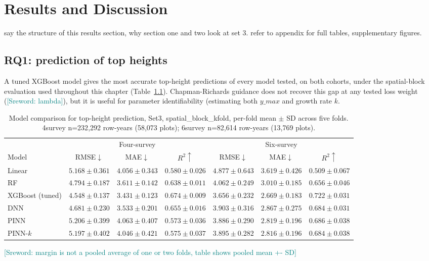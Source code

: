 \documentclass[logo,msc,ai]{infthesis}           %
\newcommand{\sr}[1]{\textcolor{teal}{[Sreword: #1]}}
\begin{document}
\chapter{Results and Discussion}
\label{ch:results}

say the structure of this results section, why section one and two look at set 3. refer to appendix for full tables, supplementary figures. 

\section{RQ1: prediction of top heights} 

A tuned XGBoost model gives the most accurate top-height predictions of every model
tested, on both cohorts, under the spatial-block evaluation used throughout this
chapter (Table~\ref{tab:results-rq1}). Chapman-Richards guidance does not recover this
gap at any tested loss weight (\sr{lambda}), but it is useful for parameter identifiability (estimating both $y\_max$ and growth rate $k$. 


\begin{table}[!htbp]
\centering
\label{tab:results-rq1}
\scriptsize
\setlength{\tabcolsep}{3pt}
\renewcommand{\arraystretch}{0.88}
\begin{tabular}{lccc|ccc}
\hline
& \multicolumn{3}{c|}{Four-survey}
& \multicolumn{3}{c}{Six-survey} \\
Model
& RMSE${\downarrow}$ & MAE${\downarrow}$ & $R^2{\uparrow}$
& RMSE${\downarrow}$ & MAE${\downarrow}$ & $R^2{\uparrow}$ \\
\hline
Linear
& $5.168{\pm}0.361$ & $4.056{\pm}0.343$ & $0.580{\pm}0.026$
& $4.877{\pm}0.643$ & $3.619{\pm}0.426$ & $0.509{\pm}0.067$ \\
RF
& $4.794{\pm}0.187$ & $3.611{\pm}0.142$ & $0.638{\pm}0.011$
& $4.062{\pm}0.249$ & $3.010{\pm}0.185$ & $0.656{\pm}0.046$ \\
XGBoost (tuned)
& $\mathbf{4.548{\pm}0.137}$ & $\mathbf{3.431{\pm}0.123}$ & $\mathbf{0.674{\pm}0.009}$
& $\mathbf{3.656{\pm}0.232}$ & $\mathbf{2.669{\pm}0.183}$ & $\mathbf{0.722{\pm}0.031}$ \\
DNN
& $4.681{\pm}0.230$ & $3.533{\pm}0.201$ & $0.655{\pm}0.016$
& $3.903{\pm}0.316$ & $2.867{\pm}0.275$ & $0.684{\pm}0.031$ \\
PINN
& $5.206{\pm}0.399$ & $4.063{\pm}0.407$ & $0.573{\pm}0.036$
& $3.886{\pm}0.290$ & $2.819{\pm}0.196$ & $0.686{\pm}0.038$ \\
PINN-$k$
& $5.197{\pm}0.402$ & $4.046{\pm}0.421$ & $0.575{\pm}0.037$
& $3.895{\pm}0.282$ & $2.816{\pm}0.196$ & $0.684{\pm}0.038$ \\
\bottomrule
\end{tabular}
\caption{Model comparison for top-height prediction, Set3, spatial\_block\_kfold,
per-fold mean $\pm$ SD across five folds. 4survey n=232{,}292 row-years (58{,}073
plots); 6survey n=82{,}614 row-years (13{,}769 plots).} \sr{margin is not a pooled average of one or two folds, table shows pooled mean +- SD} %
\end{table}
\end{document}
